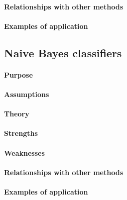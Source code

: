 \paragraph{Relationships with other methods}
\paragraph{Examples of application}


\subsection{Naive Bayes classifiers}
\paragraph{Purpose}
\paragraph{Assumptions}
\paragraph{Theory}
\paragraph{Strengths}
\paragraph{Weaknesses}
\paragraph{Relationships with other methods}
\paragraph{Examples of application}

